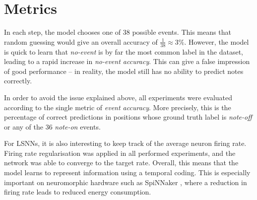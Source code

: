 \documentclass[../../report.tex]{subfiles}
\begin{document}
\section{Metrics}

In each step, the model chooses one of 38 possible events. This means that
random guessing would give an overall accuracy of \(\frac{1}{38} \approx 3\%\).
However, the model is quick to learn that \emph{no-event} is by far the most
common label in the dataset, leading to a rapid increase in \emph{no-event
accuracy}. This can give a false impression of good performance -- in reality,
the model still has no ability to predict notes correctly.


In order to avoid the issue explained above, all experiments were evaluated
according to the single metric of \emph{event accuracy}. More precisely, this is
the percentage of correct predictions in positions whose ground truth label is
\emph{note-off} or any of the 36 \emph{note-on} events.

For LSNNs, it is also interesting to keep track of the average neuron firing
rate. Firing rate regularisation was applied in all performed experiments, and
the network was able to converge to the target rate. Overall, this means that
the model learns to represent information using a temporal coding. This is
especially important on neuromorphic hardware such as SpiNNaker
\cite{Furber2014}, where a reduction in firing rate leads to reduced energy
consumption.

\end{document}
